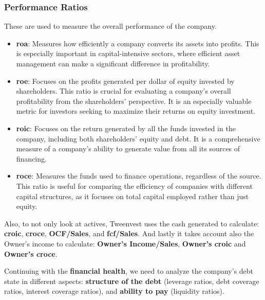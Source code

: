\documentclass[11pt,english,a4paper,hidelinks]{book}
\begin{document}
\subsubsection{Performance Ratios}
These are used to measure the overall performance of the company.
\begin{itemize}
    \item \textbf{\gls{roa}}: Measures how efficiently a company converts its assets into profits. This is especially important in capital-intensive sectors, where efficient asset management can make a significant difference in profitability.
    
    \item \textbf{\gls{roe}}: Focuses on the profits generated per dollar of equity invested by shareholders. This ratio is crucial for evaluating a company's overall profitability from the shareholders' perspective. It is an especially valuable metric for investors seeking to maximize their returns on equity investment.
    
    \item \textbf{\gls{roic}}: Focuses on the return generated by all the funds invested in the company, including both shareholders' equity and debt. It is a comprehensive measure of a company's ability to generate value from all its sources of financing.
    
    \item \textbf{\gls{roce}}: Measures the funds used to finance operations, regardless of the source. This ratio is useful for comparing the efficiency of companies with different capital structures, as it focuses on total capital employed rather than just equity.
\end{itemize}

\noindent Also, to not only look at actives, Tweenvest uses the cash generated to calculate: \textbf{\gls{croic}}, \textbf{\gls{croce}}, \textbf{OCF/Sales}, and \textbf{\gls{fcf}/Sales}. And lastly it takes account also the Owner's income to calculate: \textbf{Owner's Income/Sales}, \textbf{Owner's \acrshort{croic}} and \textbf{Owner's \acrshort{croce}}.

\vspace{0.5cm}
\noindent Continuing with the \textbf{financial health}, we need to analyze the company's debt state in different aspects: \textbf{structure of the debt} (leverage ratios, debt coverage ratios, interest coverage ratios), and \textbf{ability to pay} (liquidity ratios).
\end{document}
